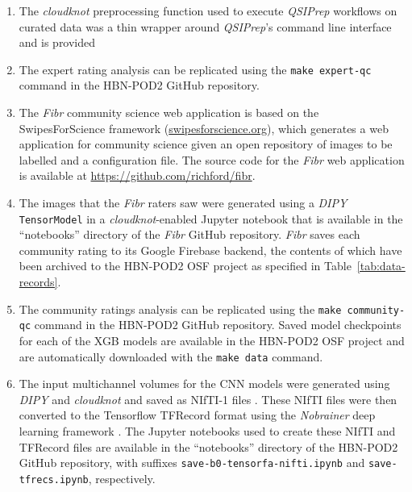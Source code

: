 \documentclass[fleqn,10pt,inline]{wlscirep}
\begin{document}
\begin{enumerate}
    \item The \emph{cloudknot} preprocessing function used to execute \emph{QSIPrep} workflows on curated data was a thin wrapper around \emph{QSIPrep}'s command line interface and is provided

    \item The expert rating analysis can be replicated using the \texttt{make expert-qc} command in the HBN-POD2 GitHub repository.
    
    \item The \emph{Fibr} community science web application is based on the SwipesForScience framework (\url{swipesforscience.org}), which generates a web application for community science given an open repository of images to be labelled and a configuration file. The source code for the \emph{Fibr} web application is available at \url{https://github.com/richford/fibr}.
    
    \item The images that the \emph{Fibr} raters saw were generated using a \emph{DIPY} \cite{dipy} \texttt{TensorModel} in a \emph{cloudknot}-enabled Jupyter notebook that is available in the ``notebooks'' directory of the \emph{Fibr} GitHub repository. \emph{Fibr} saves each community rating to its Google Firebase backend, the contents of which have been archived to the HBN-POD2 OSF project as specified in Table~\ref{tab:data-records}.

    \item The community ratings analysis can be replicated using the \texttt{make community-qc} command in the HBN-POD2 GitHub repository. Saved model checkpoints for each of the XGB models are available in the HBN-POD2 OSF project and are automatically downloaded with the \texttt{make data} command.
    
    \item The input multichannel volumes for the CNN models were generated using \emph{DIPY} \cite{dipy} and \emph{cloudknot} \cite{cloudknot} and saved as NIfTI-1 files \cite{nifti}. These NIfTI files were then converted to the Tensorflow TFRecord format using the \emph{Nobrainer} deep learning framework \cite{nobrainer}. The Jupyter notebooks used to create these NIfTI and TFRecord files are available in the ``notebooks'' directory of the HBN-POD2 GitHub repository, with suffixes \texttt{save-b0-tensorfa-nifti.ipynb} and \texttt{save-tfrecs.ipynb}, respectively.
    

\end{enumerate}
\end{document}
